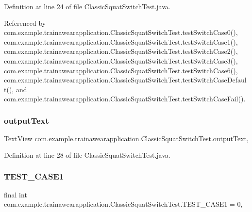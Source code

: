 Definition at line 24 of file Classic\+Squat\+Switch\+Test.\+java.



Referenced by com.\+example.\+trainawearapplication.\+Classic\+Squat\+Switch\+Test.\+test\+Switch\+Case0(), com.\+example.\+trainawearapplication.\+Classic\+Squat\+Switch\+Test.\+test\+Switch\+Case1(), com.\+example.\+trainawearapplication.\+Classic\+Squat\+Switch\+Test.\+test\+Switch\+Case2(), com.\+example.\+trainawearapplication.\+Classic\+Squat\+Switch\+Test.\+test\+Switch\+Case3(), com.\+example.\+trainawearapplication.\+Classic\+Squat\+Switch\+Test.\+test\+Switch\+Case6(), com.\+example.\+trainawearapplication.\+Classic\+Squat\+Switch\+Test.\+test\+Switch\+Case\+Default(), and com.\+example.\+trainawearapplication.\+Classic\+Squat\+Switch\+Test.\+test\+Switch\+Case\+Fail().

\mbox{\label{classcom_1_1example_1_1trainawearapplication_1_1_classic_squat_switch_test_a5942ceb5c90ba3b912bb91020e3989ee}} 
\subsubsection{\texorpdfstring{outputText}{outputText}}
{\footnotesize\ttfamily Text\+View com.\+example.\+trainawearapplication.\+Classic\+Squat\+Switch\+Test.\+output\+Text\hspace{0.3cm}{\ttfamily [static]}, {\ttfamily [private]}}



Definition at line 28 of file Classic\+Squat\+Switch\+Test.\+java.

\mbox{\label{classcom_1_1example_1_1trainawearapplication_1_1_classic_squat_switch_test_ad7aca3b01b79d4797ff05766d3e15059}} 
\subsubsection{\texorpdfstring{TEST\_CASE1}{TEST\_CASE1}}
{\footnotesize\ttfamily final int com.\+example.\+trainawearapplication.\+Classic\+Squat\+Switch\+Test.\+T\+E\+S\+T\+\_\+\+C\+A\+S\+E1 = 0\hspace{0.3cm}{\ttfamily [static]}, {\ttfamily [private]}}



